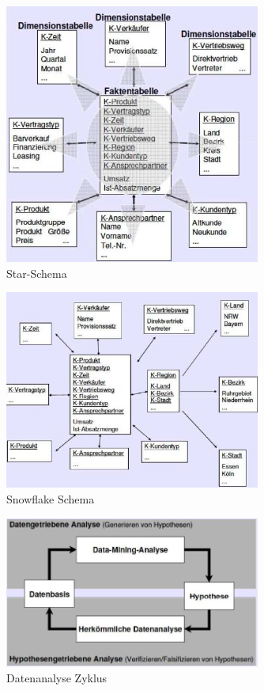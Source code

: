 \documentclass[ngerman,a4paper,12pt]{scrreprt}
\begin{document}
\begin{figure}[H]
	\centering
	\includegraphics[width=0.75\textwidth]{img/V7.3.jpg}
	\caption{Star-Schema}
	\label{}
\end{figure}

\begin{figure}[H]
	\centering
	\includegraphics[width=0.75\textwidth]{img/V7.4.jpg}
	\caption{Snowflake Schema}
	\label{}
\end{figure}



\begin{figure}[H]
	\centering
	\includegraphics[width=0.75\textwidth]{img/V7.5.jpg}
	\caption{Datenanalyse Zyklus}
	\label{}
\end{figure}
\end{document}
